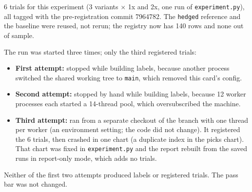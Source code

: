 \documentclass{article}
\begin{document}
6 trials for this experiment (3 variants \ensuremath{\times} 1x and 2x, one run of \texttt{experiment.\allowbreak{}py}), all tagged with the pre-registration commit 7964782. The \texttt{hedged} reference and the baseline were reused, not rerun; the registry now has 140 rows and none out of sample.

The run was started three times; only the third registered trials:

\begin{itemize}

\item \textbf{First attempt:} stopped while building labels, because another process switched the shared working tree to \texttt{main}, which removed this card's config.

\item \textbf{Second attempt:} stopped by hand while building labels, because 12 worker processes each started a 14-thread pool, which oversubscribed the machine.

\item \textbf{Third attempt:} ran from a separate checkout of the branch with one thread per worker (an environment setting; the code did not change). It registered the 6 trials, then crashed in one chart (a duplicate index in the picks chart). That chart was fixed in \texttt{experiment.\allowbreak{}py} and the report rebuilt from the saved runs in report-only mode, which adds no trials.

\end{itemize}

Neither of the first two attempts produced labels or registered trials. The pass bar was not changed.
\end{document}
